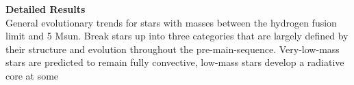 \textbf{Detailed Results} \\
General evolutionary trends for stars with masses between the hydrogen fusion limit and 5 Msun. Break stars up into three categories that are largely defined by their structure and evolution throughout the pre-main-sequence. Very-low-mass stars are predicted to remain fully convective, low-mass stars develop a radiative core at some 
